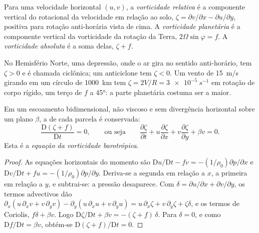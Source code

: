 \begin{definition}\label{def:b3:atmospheric-dynamics:vorticity-kinds}
Para uma velocidade horizontal $(u, v)$, a \emph{vorticidade
relativa} é a componente vertical do rotacional
da velocidade em relação ao solo, $\zeta = \partial v/\partial x -
\partial u/\partial y$, positiva para rotação anti-horária vista de cima.
A \emph{vorticidade planetária} é a componente
vertical da vorticidade da rotação da Terra, $2\Omega\sin\varphi =
f$. A \emph{vorticidade absoluta} é a soma delas,
$\zeta + f$.
\end{definition}

No Hemisfério Norte, uma depressão, onde o ar gira no sentido anti-horário,
tem $\zeta > 0$ e é chamada ciclônica; um anticiclone tem $\zeta < 0$. Um
vento de \qty{15}{m/s} girando em um círculo de \qty{1000}{km} tem $\zeta =
2V/R = \qty{3e-5}{s^{-1}}$ em rotação de corpo rígido, um terço de $f$ a \ang{45}:
a parte planetária costuma ser a maior.

\begin{theorem}\label{thm:b3:atmospheric-dynamics:bve}
Em um escoamento bidimensional, não viscoso e sem divergência horizontal sobre um
plano $\beta$, a  de cada parcela é conservada:
\[
\frac{\mathrm D(\zeta + f)}{\mathrm Dt} = 0 ,
\qquad\text{ou seja}\qquad
\frac{\partial\zeta}{\partial t} + u\frac{\partial\zeta}{\partial x} + v\frac{\partial\zeta}{\partial y} + \beta v = 0 .
\]
Esta é a \emph{equação da vorticidade barotrópica}.
\end{theorem}

\begin{proof}
As equações horizontais do momento são $\mathrm Du/\mathrm Dt - fv =
-(1/\rho_0)\partial p/\partial x$ e $\mathrm Dv/\mathrm Dt + fu =
-(1/\rho_0)\partial p/\partial y$. Deriva-se a segunda em relação a
$x$, a primeira em relação a $y$, e subtrai-se: a pressão desaparece.
Com $\delta = \partial u/\partial x + \partial v/\partial y$, os termos
advectivos dão $\partial_x(u\,\partial_xv + v\,\partial_yv) -
\partial_y(u\,\partial_xu + v\,\partial_yu) = u\,\partial_x\zeta +
v\,\partial_y\zeta + \zeta\delta$, e os termos de Coriolis, $f\delta + \beta
v$. Logo $\mathrm D\zeta/\mathrm Dt + \beta v = -(\zeta + f)\,\delta$. Para
$\delta = 0$, e como $\mathrm Df/\mathrm Dt = \beta v$, obtém-se $\mathrm D(\zeta +
f)/\mathrm Dt = 0$.
\end{proof}

